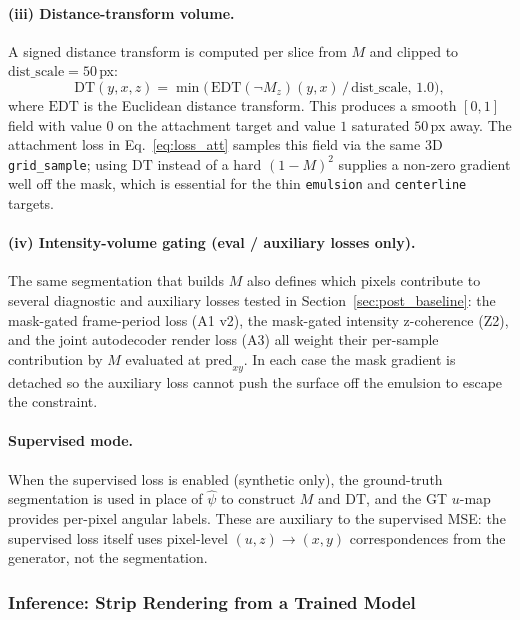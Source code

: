 \documentclass[11pt,a4paper]{article}
\begin{document}
\paragraph{(iii) Distance-transform volume.} A signed distance transform is computed per slice from $M$ and clipped to $\mathrm{dist\_scale} = 50$\,px:
\begin{equation}
    \mathrm{DT}(y, x, z) = \min\bigl(\,\mathrm{EDT}(\neg M_z)(y, x)\,/\,\mathrm{dist\_scale},\,1.0\bigr),
\end{equation}
where $\mathrm{EDT}$ is the Euclidean distance transform. This produces a smooth $[0, 1]$ field with value $0$ on the attachment target and value $1$ saturated $50$\,px away. The attachment loss in Eq.~\eqref{eq:loss_att} samples this field via the same 3D \texttt{grid\_sample}; using $\mathrm{DT}$ instead of a hard $(1 - M)^2$ supplies a non-zero gradient well off the mask, which is essential for the thin \texttt{emulsion} and \texttt{centerline} targets.

\paragraph{(iv) Intensity-volume gating (eval / auxiliary losses only).} The same segmentation that builds $M$ also defines which pixels contribute to several diagnostic and auxiliary losses tested in Section~\ref{sec:post_baseline}: the mask-gated frame-period loss (A1 v2), the mask-gated intensity z-coherence (Z2), and the joint autodecoder render loss (A3) all weight their per-sample contribution by $M$ evaluated at $\mathrm{pred}_{xy}$. In each case the mask gradient is detached so the auxiliary loss cannot push the surface off the emulsion to escape the constraint.

\paragraph{Supervised mode.} When the supervised loss is enabled (synthetic only), the ground-truth segmentation is used in place of $\hat\psi$ to construct $M$ and $\mathrm{DT}$, and the GT $u$-map provides per-pixel angular labels. These are auxiliary to the supervised MSE: the supervised loss itself uses pixel-level $(u, z) \to (x, y)$ correspondences from the generator, not the segmentation.

\subsubsection{Inference: Strip Rendering from a Trained Model}
\label{sec:inference}
\end{document}
